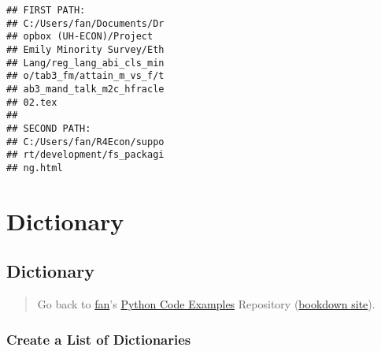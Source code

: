 \documentclass[
]{book}
\begin{document}
\begin{verbatim}
## FIRST PATH:
## C:/Users/fan/Documents/Dr
## opbox (UH-ECON)/Project
## Emily Minority Survey/Eth
## Lang/reg_lang_abi_cls_min
## o/tab3_fm/attain_m_vs_f/t
## ab3_mand_talk_m2c_hfracle
## 02.tex
## 
## SECOND PATH:
## C:/Users/fan/R4Econ/suppo
## rt/development/fs_packagi
## ng.html
\end{verbatim}

\hypertarget{dictionary}{%
\section{Dictionary}\label{dictionary}}

\hypertarget{dictionary-1}{%
\subsection{Dictionary}\label{dictionary-1}}

\begin{quote}
Go back to \href{http://fanwangecon.github.io/}{fan}'s \href{https://fanwangecon.github.io/pyfan/}{Python Code Examples} Repository (\href{https://fanwangecon.github.io/pyfan/bookdown}{bookdown site}).
\end{quote}

\hypertarget{create-a-list-of-dictionaries}{%
\subsubsection{Create a List of Dictionaries}\label{create-a-list-of-dictionaries}}
\end{document}
